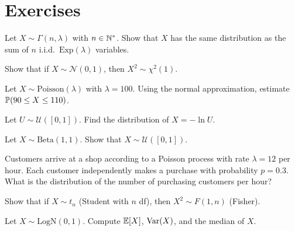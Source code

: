 \section{Exercises}

\begin{exercise}
Let $X \sim \Gamma(n, \lambda)$ with $n \in \mathbb{N}^*$. Show that $X$ has the same
distribution as the sum of $n$ i.i.d.\ $\mathrm{Exp}(\lambda)$ variables.
\end{exercise}

\begin{exercise}
Show that if $X \sim \mathcal{N}(0,1)$, then $X^2 \sim \chi^2(1)$.
\end{exercise}

\begin{exercise}
Let $X \sim \mathrm{Poisson}(\lambda)$ with $\lambda = 100$. Using the normal
approximation, estimate $\mathbb{P}(90 \leq X \leq 110)$.
\end{exercise}

\begin{exercise}
Let $U \sim \mathcal{U}([0,1])$. Find the distribution of $X = -\ln U$.
\end{exercise}

\begin{exercise}
Let $X \sim \mathrm{Beta}(1,1)$. Show that $X \sim \mathcal{U}([0,1])$.
\end{exercise}

\begin{exercise}
Customers arrive at a shop according to a Poisson process with rate
$\lambda = 12$ per hour. Each customer independently makes a purchase with
probability $p = 0.3$. What is the distribution of the number of purchasing
customers per hour?
\end{exercise}

\begin{exercise}
Show that if $X \sim t_n$ (Student with $n$ df), then $X^2 \sim F(1, n)$ (Fisher).
\end{exercise}

\begin{exercise}
Let $X \sim \mathrm{LogN}(0, 1)$. Compute $\mathbb{E}[X]$, $\mathrm{Var}(X)$, and the median of $X$.
\end{exercise}
